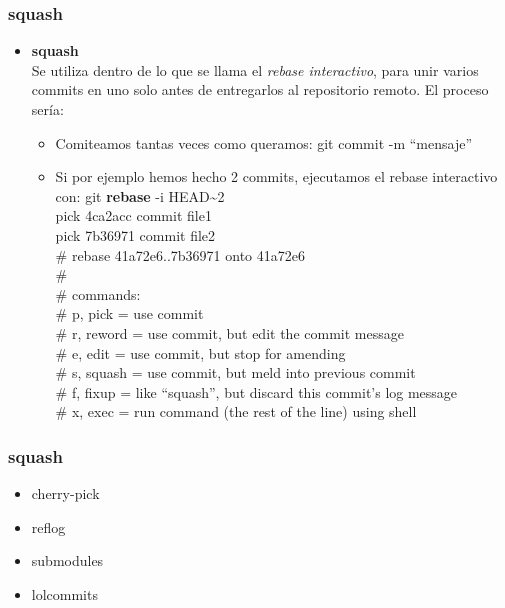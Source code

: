 \frame
{
\frametitle{squash}
\begin{itemize}
 \item \textbf{squash}\\ \indent
 Se utiliza dentro de lo que se llama el \textit{rebase interactivo}, para unir varios commits en uno solo antes de entregarlos al repositorio remoto. El proceso sería:
 \begin{itemize}
  \item Comiteamos tantas veces como queramos: git commit -m ``mensaje''
  \item Si por ejemplo hemos hecho 2 commits, ejecutamos el rebase interactivo con: git \textbf{rebase} -i HEAD\textasciitilde2\\ \vspace{0.2cm}
  \footnotesize
   pick 4ca2acc commit file1\\
   pick 7b36971 commit file2\\
   
   \# rebase 41a72e6..7b36971 onto 41a72e6\\
   \#\\
   \# commands:\\
   \#  p, pick = use commit\\
   \#  r, reword = use commit, but edit the commit message\\
   \#  e, edit = use commit, but stop for amending\\
   \#  s, squash = use commit, but meld into previous commit\\
   \#  f, fixup = like ``squash'', but discard this commit's log message\\
   \#  x, exec = run command (the rest of the line) using shell
 \end{itemize}
\end{itemize}
}

\frame
{
\frametitle{squash}
\begin{itemize}
 \item cherry-pick
 \item reflog 
 \item submodules
 \item lolcommits 
\end{itemize}
}
